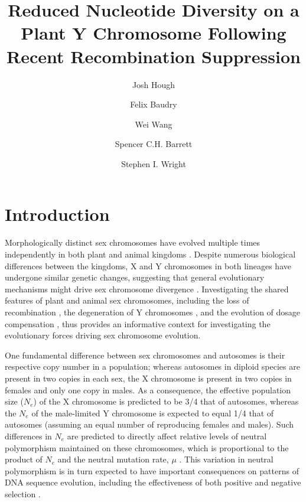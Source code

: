 \documentclass[9pt,twocolumn,twoside]{gsajnl}
\title{Reduced Nucleotide Diversity on a Plant Y Chromosome Following Recent Recombination Suppression}
\author[$\ast$,$\dagger$,1]{Josh Hough}
\author[$\dagger$]{Felix Baudry}
\author[$\dagger$]{Wei Wang}
\author[$\dagger$]{Spencer C.H. Barrett}
\author[$\dagger$]{Stephen I. Wright}
\affil[$\ast$]{Department of Plant Sciences, University of California, Davis}
\affil[$\dagger$]{Department of Ecology and Evolutionary Biology, University of Toronto}
\begin{document}
\maketitle
\thispagestyle{firststyle}
\marginmark
\firstpagefootnote
{}
\vspace{-11pt}%

\section*{Introduction}

\lettrine[lines=2]{\color{color2}M}{}orphologically distinct sex chromosomes have evolved multiple times independently in both plant and animal kingdoms \citep{westergaard1958,ohno1967,bull1983,charlesworth1991}. Despite numerous biological differences between the kingdoms, X and Y chromosomes in both lineages have undergone similar genetic changes, suggesting that general evolutionary mechanisms might drive sex chromosome divergence \citep{charlesworth1978,charlesworth1996CB,charlesworth2000degeneration}. Investigating the shared features of plant and animal sex chromosomes, including the loss of recombination \citep{bergero2009}, the degeneration of Y chromosomes \citep{hough2014,bergero2015}, and the evolution of dosage compensation \citep{muyle2012,papadopulos2015}, thus provides an informative context for investigating the evolutionary forces driving sex chromosome evolution. 

One fundamental difference between sex chromosomes and autosomes is their respective copy number in a population; whereas autosomes in diploid species are present in two copies in each sex, the X chromosome is present in two copies in females and only one copy in males. As a consequence, the effective population size ($N_{e}$) of the X chromosome is predicted to be 3/4 that of autosomes, whereas the $N_{e}$ of the male-limited Y chromosome is expected to equal 1/4 that of autosomes (assuming an equal number of reproducing females and males). Such differences in $N_{e}$ are predicted to directly affect relative levels of neutral polymorphism maintained on these chromosomes, which is proportional to the product of $N_{e}$ and the neutral mutation rate, $\mu$ \citep{Kimura1984}. This variation in neutral polymorphism is in turn expected to have important consequences on patterns of DNA sequence evolution, including the effectiveness of both positive and negative selection \citep{charlesworth1987}.
\end{document}
